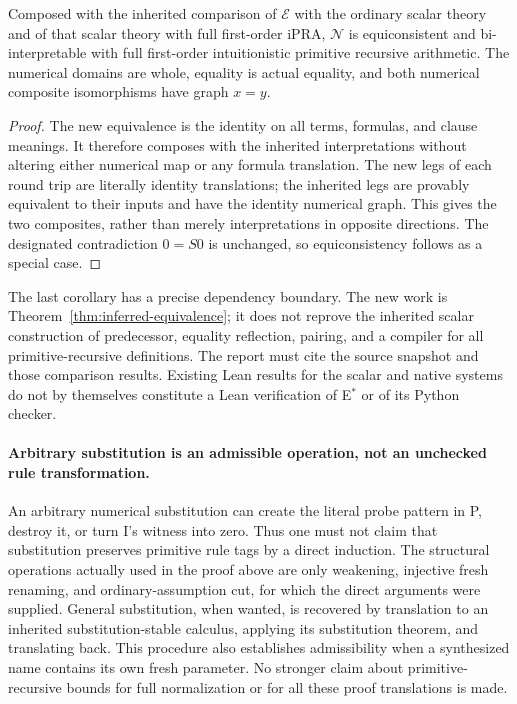 \begin{corollary}
\label{cor:inferred-ipra}
Composed with the inherited comparison of $\mathcal E$ with the ordinary
scalar theory and of that scalar theory with full first-order iPRA,
$\mathcal N$ is equiconsistent and bi-interpretable with full first-order
intuitionistic primitive recursive arithmetic. The numerical domains are
whole, equality is actual equality, and both numerical composite
isomorphisms have graph $x=y$.
\end{corollary}
\begin{proof}
The new equivalence is the identity on all terms, formulas, and clause
meanings. It therefore composes with the inherited interpretations without
altering either numerical map or any formula translation. The new legs of
each round trip are literally identity translations; the inherited legs
are provably equivalent to their inputs and have the identity numerical
graph. This gives the two composites, rather than merely interpretations
in opposite directions. The designated contradiction $0=S0$ is unchanged,
so equiconsistency follows as a special case.
\end{proof}

The last corollary has a precise dependency boundary. The new work is
Theorem~\ref{thm:inferred-equivalence}; it does not reprove the inherited
scalar construction of predecessor, equality reflection, pairing, and a
compiler for all primitive-recursive definitions. The report must cite the
source snapshot and those comparison results. Existing Lean results for the
scalar and native systems do not by themselves constitute a Lean
verification of E$^*$ or of its Python checker.

\paragraph{Arbitrary substitution is an admissible operation, not an
unchecked rule transformation.}
An arbitrary numerical substitution can create the literal probe pattern
in P, destroy it, or turn I's witness into zero. Thus one must not claim
that substitution preserves primitive rule tags by a direct induction.
The structural operations actually used in the proof above are only
weakening, injective fresh renaming, and ordinary-assumption cut, for which
the direct arguments were supplied. General substitution, when wanted,
is recovered by translation to an inherited substitution-stable calculus,
applying its substitution theorem, and translating back. This procedure
also establishes admissibility when a synthesized name contains its own
fresh parameter. No stronger claim about primitive-recursive bounds for
full normalization or for all these proof translations is made.
